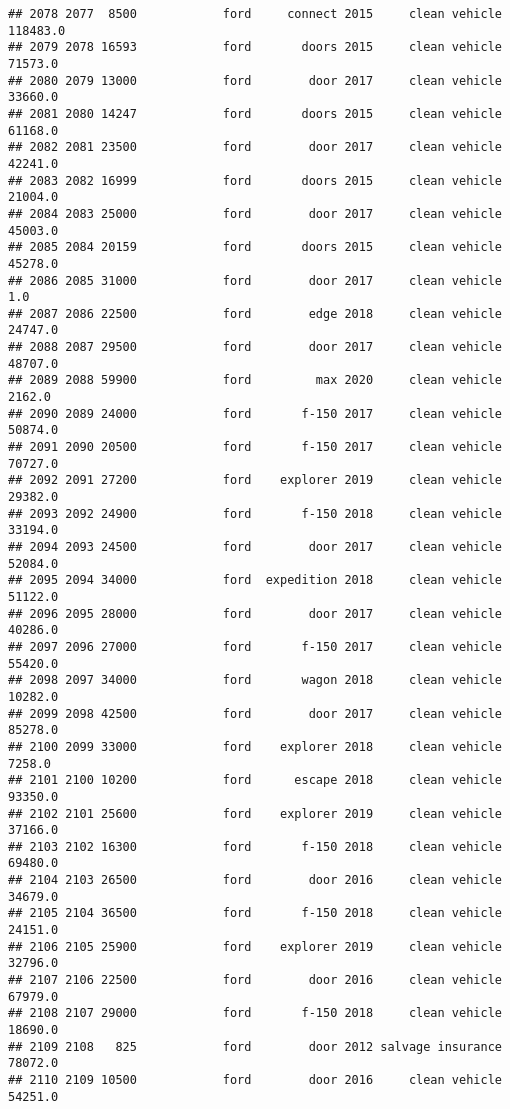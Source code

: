 \documentclass[
]{article}
\begin{document}
\begin{verbatim}
## 2078 2077  8500            ford     connect 2015     clean vehicle  118483.0
## 2079 2078 16593            ford       doors 2015     clean vehicle   71573.0
## 2080 2079 13000            ford        door 2017     clean vehicle   33660.0
## 2081 2080 14247            ford       doors 2015     clean vehicle   61168.0
## 2082 2081 23500            ford        door 2017     clean vehicle   42241.0
## 2083 2082 16999            ford       doors 2015     clean vehicle   21004.0
## 2084 2083 25000            ford        door 2017     clean vehicle   45003.0
## 2085 2084 20159            ford       doors 2015     clean vehicle   45278.0
## 2086 2085 31000            ford        door 2017     clean vehicle       1.0
## 2087 2086 22500            ford        edge 2018     clean vehicle   24747.0
## 2088 2087 29500            ford        door 2017     clean vehicle   48707.0
## 2089 2088 59900            ford         max 2020     clean vehicle    2162.0
## 2090 2089 24000            ford       f-150 2017     clean vehicle   50874.0
## 2091 2090 20500            ford       f-150 2017     clean vehicle   70727.0
## 2092 2091 27200            ford    explorer 2019     clean vehicle   29382.0
## 2093 2092 24900            ford       f-150 2018     clean vehicle   33194.0
## 2094 2093 24500            ford        door 2017     clean vehicle   52084.0
## 2095 2094 34000            ford  expedition 2018     clean vehicle   51122.0
## 2096 2095 28000            ford        door 2017     clean vehicle   40286.0
## 2097 2096 27000            ford       f-150 2017     clean vehicle   55420.0
## 2098 2097 34000            ford       wagon 2018     clean vehicle   10282.0
## 2099 2098 42500            ford        door 2017     clean vehicle   85278.0
## 2100 2099 33000            ford    explorer 2018     clean vehicle    7258.0
## 2101 2100 10200            ford      escape 2018     clean vehicle   93350.0
## 2102 2101 25600            ford    explorer 2019     clean vehicle   37166.0
## 2103 2102 16300            ford       f-150 2018     clean vehicle   69480.0
## 2104 2103 26500            ford        door 2016     clean vehicle   34679.0
## 2105 2104 36500            ford       f-150 2018     clean vehicle   24151.0
## 2106 2105 25900            ford    explorer 2019     clean vehicle   32796.0
## 2107 2106 22500            ford        door 2016     clean vehicle   67979.0
## 2108 2107 29000            ford       f-150 2018     clean vehicle   18690.0
## 2109 2108   825            ford        door 2012 salvage insurance   78072.0
## 2110 2109 10500            ford        door 2016     clean vehicle   54251.0

\end{verbatim}
\end{document}
